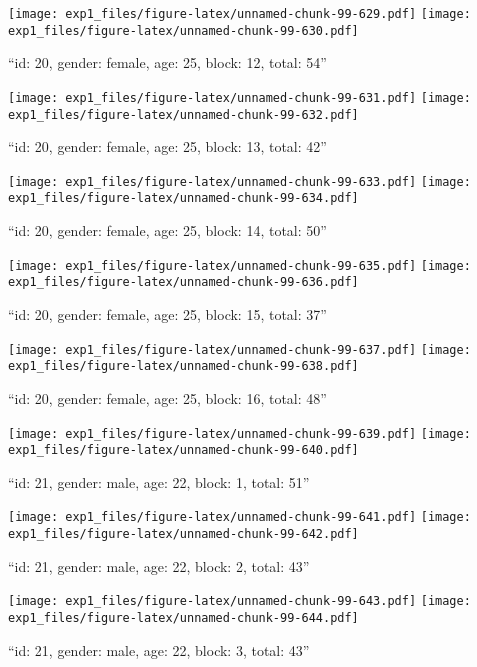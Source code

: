 \documentclass[,]{article}
\begin{document}
\texttt{[image: exp1\_files/figure-latex/unnamed-chunk-99-629.pdf]}
\texttt{[image: exp1\_files/figure-latex/unnamed-chunk-99-630.pdf]}

\newpage
[1] 

``id: 20, gender: female, age: 25, block: 12, total: 54''

\texttt{[image: exp1\_files/figure-latex/unnamed-chunk-99-631.pdf]}
\texttt{[image: exp1\_files/figure-latex/unnamed-chunk-99-632.pdf]}

\newpage
[1] 

``id: 20, gender: female, age: 25, block: 13, total: 42''

\texttt{[image: exp1\_files/figure-latex/unnamed-chunk-99-633.pdf]}
\texttt{[image: exp1\_files/figure-latex/unnamed-chunk-99-634.pdf]}

\newpage
[1] 

``id: 20, gender: female, age: 25, block: 14, total: 50''

\texttt{[image: exp1\_files/figure-latex/unnamed-chunk-99-635.pdf]}
\texttt{[image: exp1\_files/figure-latex/unnamed-chunk-99-636.pdf]}

\newpage
[1] 

``id: 20, gender: female, age: 25, block: 15, total: 37''

\texttt{[image: exp1\_files/figure-latex/unnamed-chunk-99-637.pdf]}
\texttt{[image: exp1\_files/figure-latex/unnamed-chunk-99-638.pdf]}

\newpage
[1] 

``id: 20, gender: female, age: 25, block: 16, total: 48''

\texttt{[image: exp1\_files/figure-latex/unnamed-chunk-99-639.pdf]}
\texttt{[image: exp1\_files/figure-latex/unnamed-chunk-99-640.pdf]}

\newpage
[1] 

``id: 21, gender: male, age: 22, block: 1, total: 51''

\texttt{[image: exp1\_files/figure-latex/unnamed-chunk-99-641.pdf]}
\texttt{[image: exp1\_files/figure-latex/unnamed-chunk-99-642.pdf]}

\newpage
[1] 

``id: 21, gender: male, age: 22, block: 2, total: 43''

\texttt{[image: exp1\_files/figure-latex/unnamed-chunk-99-643.pdf]}
\texttt{[image: exp1\_files/figure-latex/unnamed-chunk-99-644.pdf]}

\newpage
[1] 

``id: 21, gender: male, age: 22, block: 3, total: 43''
\end{document}

